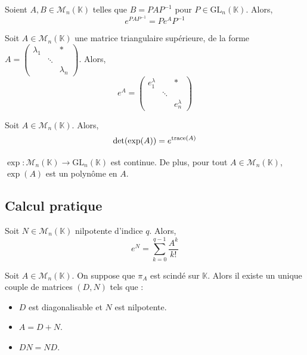   \begin{proposition}
    Soient $A, B \in \mathcal{M}_n(\mathbb{K})$ telles que $B = PAP^{-1}$ pour $P \in \mathrm{GL}_n(\mathbb{K})$. Alors,
    \[ e^{PAP^{-1}} = Pe^AP^{-1} \]
  \end{proposition}

  \begin{lemma}
    Soit $A \in \mathcal{M}_n(\mathbb{K})$ une matrice triangulaire supérieure, de la forme $A = \begin{pmatrix} \lambda_1 & & * \\ & \ddots & \\ & & \lambda_n \end{pmatrix}$. Alors,
    \[
      e^A =
      \begin{pmatrix}
        e^\lambda_1 & & * \\
        & \ddots & \\
        & & e^\lambda_n
      \end{pmatrix}
    \]
  \end{lemma}


  \begin{proposition}
    Soit $A \in \mathcal{M}_n(\mathbb{K})$. Alors,
    \[ \det(\exp(A)) = e^{\operatorname{trace}(A)} \]
  \end{proposition}

  \begin{proposition}
    $\exp : \mathcal{M}_n(\mathbb{K}) \rightarrow \mathrm{GL}_n(\mathbb{K})$ est continue. De plus, pour tout $A \in \mathcal{M}_n(\mathbb{K})$, $\exp(A)$ est un polynôme en $A$.
  \end{proposition}

  \subsection{Calcul pratique}


  \begin{proposition}
    Soit $N \in \mathcal{M}_n(\mathbb{K})$ nilpotente d'indice $q$. Alors,
    \[ e^N = \sum_{k=0}^{q-1} \frac{A^k}{k!} \]
  \end{proposition}

  \begin{theorem}
    Soit $A \in \mathcal{M}_n(\mathbb{K})$. On suppose que $\pi_A$ est scindé sur $\mathbb{K}$. Alors il existe un unique couple de matrices $(D, N)$ tels que :
    \begin{itemize}
      \item $D$ est diagonalisable et $N$ est nilpotente.
      \item $A = D + N$.
      \item $DN = ND$.
    \end{itemize}
  \end{theorem}

